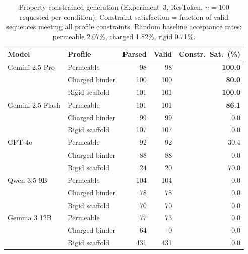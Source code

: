 \begin{table}[htbp]
\centering
\caption{Property-constrained generation (Experiment~3, ResToken, $n=100$ requested per condition). Constraint satisfaction = fraction of valid sequences meeting all profile constraints. Random baseline acceptance rates: permeable 2.07\%, charged 1.82\%, rigid 0.71\%.}
\label{tab:w2-exp3-constraints}
\small
\begin{tabular}{l l rrr}
\toprule
Model & Profile & Parsed & Valid & Constr.\ Sat.\ (\%) \\
\midrule
Gemini 2.5 Pro & Permeable & 98 & 98 & \textbf{100.0} \\
 & Charged binder & 100 & 100 & \textbf{80.0} \\
 & Rigid scaffold & 101 & 101 & \textbf{100.0} \\
\addlinespace
Gemini 2.5 Flash & Permeable & 101 & 101 & \textbf{86.1} \\
 & Charged binder & 99 & 99 & 0.0 \\
 & Rigid scaffold & 107 & 107 & 0.0 \\
\addlinespace
GPT-4o & Permeable & 92 & 92 & 30.4 \\
 & Charged binder & 88 & 88 & 0.0 \\
 & Rigid scaffold & 24 & 20 & 70.0 \\
\addlinespace
Qwen 3.5 9B & Permeable & 104 & 104 & 0.0 \\
 & Charged binder & 78 & 78 & 0.0 \\
 & Rigid scaffold & 70 & 70 & 0.0 \\
\addlinespace
Gemma 3 12B & Permeable & 77 & 73 & 0.0 \\
 & Charged binder & 64 & 0 & 0.0 \\
 & Rigid scaffold & 431 & 431 & 0.0 \\
\bottomrule
\end{tabular}
\end{table}